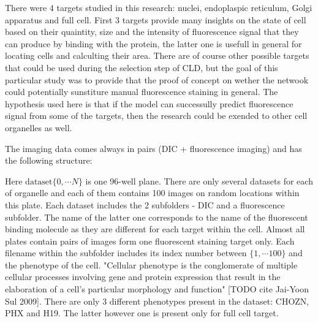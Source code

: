 There were 4 targets studied in this research: nuclei, endoplaspic reticulum, Golgi apparatus and full cell. First 3 targets provide many insights on the state of cell based on their quaintity, size and the intensity of fluorescence signal that they can produce by binding with the protein, the latter one is usefull in general for locating cells and calculting their area. There are of course other possible targets that could be used during the selection step of CLD, but the goal of this particular study was to provide that the proof of concept on wether the netwook could potentially sunstiture manual fluorescence staining in general. The hypothesis used here is that if the model can successully predict fluorescence signal from some of the targets, then the research could be exended to other cell organelles as well.

The imaging data comes always in pairs (DIC + fluorescence imaging) and has the following structure:



Here $\text{dataset}\{0, \cdots N\}$ is one 96-well plane. There are only several datasets for each of organelle and each of them contains 100 images on random locations within this plate. Each dataset includes the 2 subfolders - DIC and a fluorescence subfolder. The name of the latter one corresponds to the name of the fluorescent binding molecule as they are different for each target within the cell. Almost all plates contain pairs of images form one fluorescent staining target only. Each filename within the subfolder includes its index number between $\{1, \cdots 100\}$ and the phenotype of the cell. "Cellular phenotype is the conglomerate of multiple cellular processes involving gene and protein expression that result in the elaboration of a cell's particular morphology and function" [TODO cite Jai-Yoon Sul 2009]. There are only 3 different phenotypes present in the dataset: CHOZN, PHX and H19. The latter however one is present only for full cell target.

